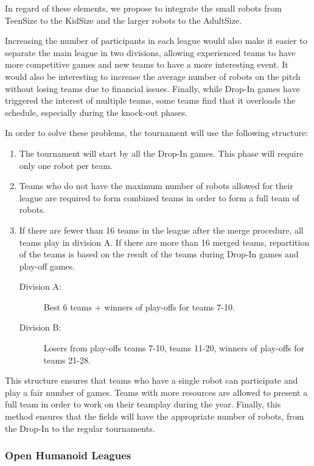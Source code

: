 \documentclass{article}
\begin{document}
In regard of these elements, we propose to integrate the small robots from
TeenSize to the KidSize and the larger robots to the AdultSize.

Increasing the number of participants in each league would also make it easier
to separate the main league in two divisions, allowing experienced teams to have
more competitive games and new teams to have a more interesting event.
It would also be interesting to increase the average number of robots on
the pitch without losing teams due to financial issues.
Finally, while Drop-In games have triggered the interest of multiple teams,
some teams find that it overloads the schedule, especially during the knock-out
phases.

In order to solve these problems, the tournament will use the following
structure:
\begin{enumerate}
\item The tournament will start by all the Drop-In games. This phase will
  require only one robot per team.
\item Teams who do not have the maximum number of robots allowed for their league
  are required to form combined teams in order to form a full team of robots.
\item If there are fewer than 16 teams in the league after the merge procedure,
  all teams play in division A.
  If there are more than 16 merged teams, repartition of the teams is based
  on the result of the teams during Drop-In games and play-off games.
  \begin{description}
  \item[Division A:] Best 6 teams + winners of play-offs for teams 7-10.
  \item[Division B:] Losers from play-offs teams 7-10, teams 11-20,
    winners of play-offs for teams 21-28.
  \end{description}
\end{enumerate}

This structure ensures that teams who have a single robot can participate and
play a fair number of games.
Teams with more resources are allowed to present a full team in order to work
on their teamplay during the year.
Finally, this method ensures that the fields will have the appropriate number
of robots, from the Drop-In to the regular tournaments.

\subsubsection{Open Humanoid Leagues}
\end{document}
